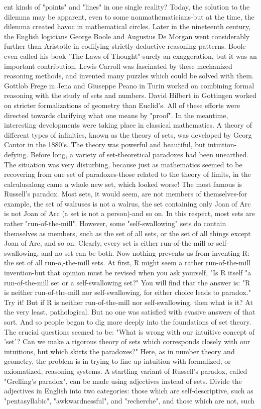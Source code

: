 ent kinds of "points" and "lines" in one single reality? Today, the solution to the dilemma may be apparent, even to some nonmathematicians-but at the time, the dilemma created havoc in mathematical circles. Later in the nineteenth century, the English logicians George Boole and Augustus De Morgan went considerably further than Aristotle in codifying strictly deductive reasoning patterns. Boole even called his book "The Laws of Thought"-surely an exaggeration, but it was an important contribution. Lewis Carroll was fascinated by these mechanized reasoning methods, and invented many puzzles which could be solved with them. Gottlob Frege in Jena and Giuseppe Peano in Turin worked on combining formal reasoning with the study of sets and numbers. David Hilbert in Gottingen worked on stricter formalizations of geometry than Euclid's. All of these efforts were directed towards clarifying what one means by "proof". In the meantime, interesting developments were taking place in classical mathematics. A theory of different types of infinities, known as the theory of sets, was developed by Georg Cantor in the 1880's. The theory was powerful and beautiful, but intuition-defying. Before long, a variety of set-theoretical paradoxes had been unearthed. The situation was very disturbing, because just as mathematics seemed to be recovering from one set of paradoxes-those related to the theory of limits, in the calculusalong came a whole new set, which looked worse! The most famous is Russell's paradox. Most sets, it would seem, are not members of themselves-for example, the set of walruses is not a walrus, the set containing only Joan of Arc is not Joan of Arc (a set is not a person)-and so on. In this respect, most sets are rather "run-of-the-mill". However, some "self-swallowing" sets do contain themselves as members, such as the set of all sets, or the set of all things except Joan of Arc, and so on. Clearly, every set is either run-of-the-mill or self-swallowing, and no set can be both. Now nothing prevents us from inventing R: the set of all run-o,-the-mill sets. At first, R might seem a rather run-of-the-mill invention-but that opinion must be revised when you ask yourself, "Is R itself "a run-of-the-mill set or a self-swallowing set?" You will find that the answer is: "R is neither run-of-the-mill nor self-swallowing, for either choice leads to paradox." Try it! But if R is neither run-of-the-mill nor self-swallowing, then what is it? At the very least, pathological. But no one was satisfied with evasive answers of that sort. And so people began to dig more deeply into the foundations of set theory. The crucial questions seemed to be: "What is wrong with our intuitive concept of 'set'? Can we make a rigorous theory of sets which corresponds closely with our intuitions, but which skirts the paradoxes?" Here, as in number theory and geometry, the problem is in trying to line up intuition with formalized, or axiomatized, reasoning systems. A startling variant of Russell's paradox, called "Grelling's paradox", can be made using adjectives instead of sets. Divide the adjectives in English into two categories: those which are self-descriptive, such as "pentasyllabic", "awkwardnessful", and "recherche", and those which are not, such 
